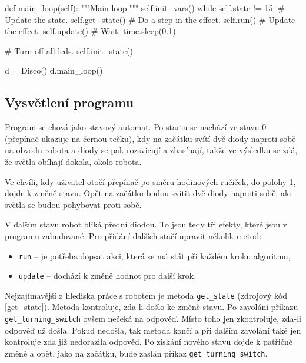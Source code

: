 \documentclass[12pt,notitlepage]{report}
\newenvironment{mylisting}{}{}
\newcommand{\code}[1]{\texttt{\small #1}}
\begin{document}
\begin{mylisting}
\begin{pyc}
    def main_loop(self):
        """Main loop."""
        self.init_vars()
        while self.state != 15:
            # Update the state.
            self.get_state()
            # Do a step in the effect.
            self.run()
            # Update the effect.
            self.update()
            # Wait.
            time.sleep(0.1)

        # Turn off all leds.
        self.init_state()

d = Disco()
d.main_loop()
\end{pyc}
\end{mylisting}

\subsection{Vysvětlení programu}

Program se chová jako stavový automat. Po startu se nachází ve stavu 0
(přepínač ukazuje na černou tečku), kdy na začátku svítí dvě diody naproti sobě
na obvodu robota a diody se pak rozsvicují a zhasínají, takže ve výsledku se
zdá, že světla obíhají dokola, okolo robota.

Ve chvíli, kdy uživatel otočí přepínač po směru hodinových ručiček, do polohy 1,
dojde k změně stavu. Opět na začátku budou svítit dvě diody naproti sobě, ale
světla se budou pohybovat proti sobě.

V dalším stavu robot blíká přední diodou. To jsou tedy tři efekty, které jsou v
programu zabudované. Pro přidání dalších stačí upravit několik metod:

\begin{itemize}
    \item \code{run} -- je potřeba dopsat akci, která se má stát při každém kroku algoritmu,
    \item \code{update} -- dochází k změně hodnot pro další krok.
\end{itemize}

Nejzajímavější z hlediska práce s robotem je metoda \code{get\_state} (zdrojový
kód \ref{get_state}). Metoda kontroluje, zda-li došlo ke změně stavu. Po
zavolání příkazu \code{get\_turning\_switch} ovšem nečeká na odpověď. Místo
toho jen zkontroluje, zda-li odpověď už došla. Pokud nedošla, tak metoda končí
a při dalším zavolání také jen kontroluje zda již nedorazila odpověď. Po
získání nového stavu dojde k patřičné změně a opět, jako na začátku, bude
zaslán příkaz \code{get\_turning\_switch}.
\end{document}
